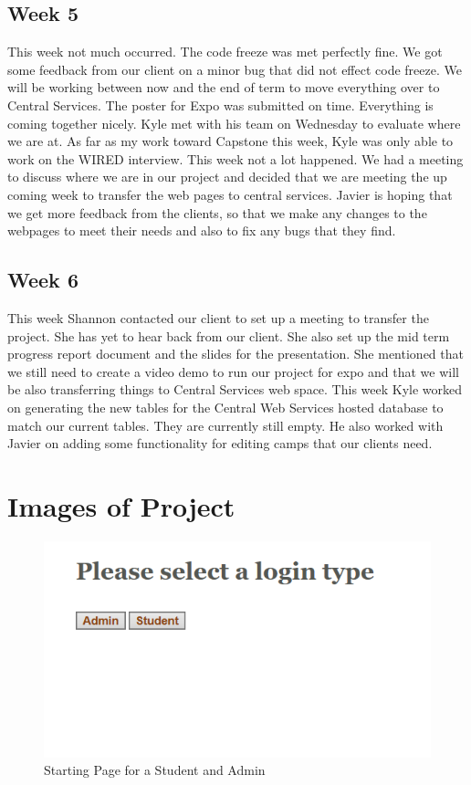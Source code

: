 \documentclass[letterpaper,10pt,serif,draftclsnofoot,onecolumn,compsoc,titlepage]{IEEEtran}
\begin{document}
\subsection{Week 5}
This week not much occurred. The code freeze was met perfectly fine. We got some feedback from our
 client on a minor bug that did not effect code freeze. We will be working between now and the end
 of term to move everything over to Central Services. The poster for Expo was submitted on time.
 Everything is coming together nicely.
 Kyle met with his team on Wednesday to evaluate where we are at. As far as my work toward Capstone 
 this week, Kyle was only able to work on the WIRED interview.
 This week not a lot happened. We had a meeting to discuss where we are in our project and decided
 that we are meeting the up coming week to transfer the web pages to central services. Javier is
 hoping that we get more feedback from the clients, so that we make any changes to the webpages to
 meet their needs and also to fix any bugs that they find.
\subsection{Week 6}
This week Shannon contacted our client to set up a meeting to transfer the project. She has yet to hear back from our client. She also set up the mid term progress report document and the slides for the presentation. She mentioned that we still need to create a video demo to run our project for expo and that we will be also transferring things to Central Services web space. This week Kyle worked on generating the new tables for the Central Web Services hosted database to match our current tables. They are currently still empty. He also worked with Javier on adding some functionality for editing camps that our clients need.

\newpage
\section{Images of Project}

\begin{figure}[!htbp]
\centering
\includegraphics[scale=.9]{ProjectImages/IndexPage.png}
\caption{Starting Page for a Student and Admin}
\label{fig:code2}
\end{figure}
\end{document}
